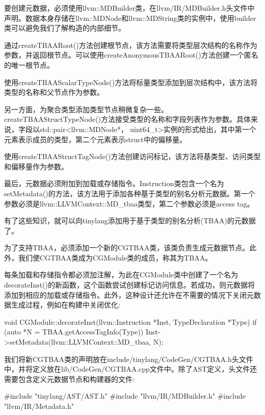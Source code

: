 要创建元数据，必须使用llvm::MDBuilder类，在llvm/IR/MDBuilder.h头文件中声明。数据本身存储在llvm::MDNode和llvm::MDString类的实例中，使用builder类可以避免我们了解构造的内部细节。

通过createTBAARoot()方法创建根节点，该方法需要将类型层次结构的名称作为参数，并返回根节点。可以使用createAnonymousTBAARoot()方法创建一个匿名的唯一根节点。

使用createTBAAScalarTypeNode()方法将标量类型添加到层次结构中，该方法将类型的名称和父节点作为参数。

另一方面，为聚合类型添加类型节点稍微复杂一些。createTBAAStructTypeNode()方法接受类型的名称和字段列表作为参数。具体来说，字段以std::pair<llvm::MDNode*， uint64\_t>实例的形式给出，其中第一个元素表示成员的类型，第二个元素表示struct中的偏移量。

使用createTBAAStructTagNode()方法创建访问标记，该方法将基类型、访问类型和偏移量作为参数。

最后，元数据必须附加到加载或存储指令。Instruction类包含一个名为setMetadata()的方法，该方法用于添加各种基于类型的别名分析元数据。第一个参数必须是llvm::LLVMContext::MD\_tbaa类型，第二个参数必须是access tag。

有了这些知识，就可以向tinylang添加用于基于类型的别名分析(TBAA)的元数据了。


为了支持TBAA，必须添加一个新的CGTBAA类，该类负责生成元数据节点。此外，我们使CGTBAA类成为CGModule类的成员，称其为TBAA。

每条加载和存储指令都必须加注解，为此在CGModule类中创建了一个名为decorateInst()的新函数，这个函数尝试创建标记访问信息。若成功，则元数据将添加到相应的加载或存储指令。此外，这种设计还允许在不需要的情况下关闭元数据生成过程，例如在构建中关闭优化:

\begin{cpp}
void CGModule::decorateInst(llvm::Instruction *Inst,
                            TypeDeclaration *Type) {
    if (auto *N = TBAA.getAccessTagInfo(Type))
        Inst->setMetadata(llvm::LLVMContext::MD_tbaa, N);
}
\end{cpp}

我们将新CGTBAA类的声明放在include/tinylang/CodeGen/CGTBAA.h头文件中，并将定义放在lib/CodeGen/CGTBAA.cpp文件中。除了AST定义，头文件还需要包含定义元数据节点和构建器的文件:

\begin{cpp}
#include "tinylang/AST/AST.h"
#include "llvm/IR/MDBuilder.h"
#include "llvm/IR/Metadata.h"
\end{cpp}

